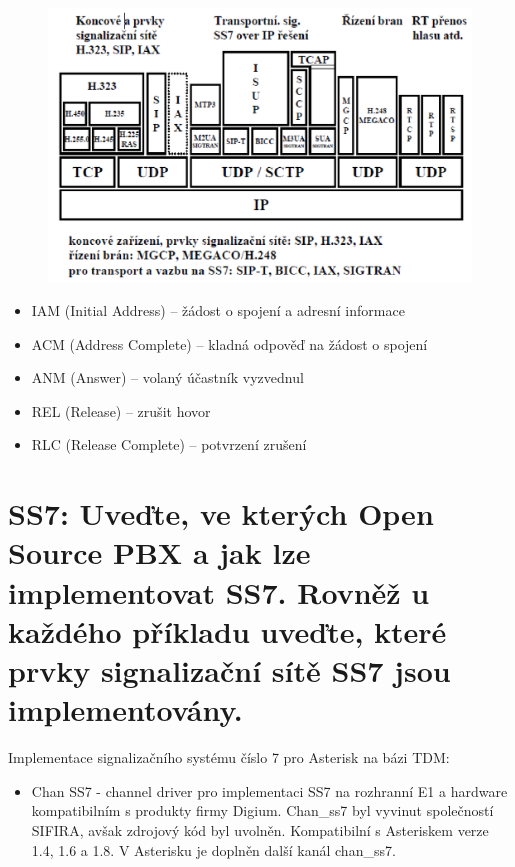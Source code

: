 \begin{figure}[h!]
    \begin{center}
        \includegraphics[width=\textwidth]{images/otazka25.png}
        \label{img:10}
    \end{center}
\end{figure}

\begin{itemize}[noitemsep]
    \item IAM (Initial Address) -- žádost o spojení a adresní informace
    \item ACM (Address Complete) -- kladná odpověď na žádost o spojení
    \item ANM (Answer) -- volaný účastník vyzvednul
    \item REL (Release) -- zrušit hovor
    \item RLC (Release Complete) -- potvrzení zrušení
\end{itemize}

\section{SS7: Uveďte, ve kterých Open Source PBX a jak lze implementovat SS7. Rovněž u každého příkladu uveďte, které prvky signalizační sítě SS7 jsou implementovány.}

Implementace signalizačního systému číslo 7 pro Asterisk na bázi TDM:
\begin{itemize}[noitemsep]
    \item Chan SS7 - channel driver pro implementaci SS7 na rozhranní E1 a hardware kompatibilním s produkty firmy Digium. Chan\_ss7 byl vyvinut společností SIFIRA, avšak zdrojový kód byl uvolněn. Kompatibilní s Asteriskem verze 1.4, 1.6 a 1.8. V Asterisku je doplněn další kanál chan\_ss7.
\end{itemize}

